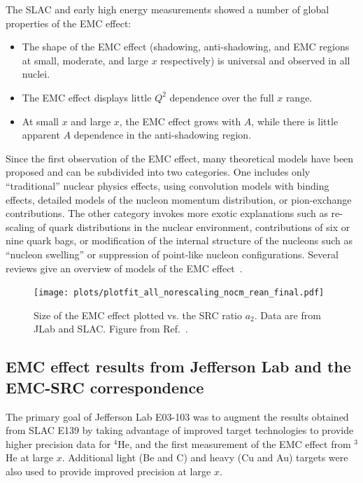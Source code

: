 The SLAC and early high energy measurements showed a number of global properties of the EMC effect:
%
\begin{itemize}
\item{The shape of the EMC effect (shadowing, anti-shadowing, and EMC regions at small, moderate, and large $x$ respectively) is universal and observed in all nuclei.}
\item{The EMC effect displays little $Q^2$ dependence over the full $x$ range.}
\item{At small $x$ and large $x$, the EMC effect grows with $A$, while there is little apparent $A$ dependence in the anti-shadowing region.}
\end{itemize}
%
Since the first observation of the EMC effect, many theoretical models have been proposed and can be subdivided into two categories.  One includes only ``traditional'' nuclear physics effects, using convolution models with binding effects, detailed models of the nucleon momentum distribution, or pion-exchange contributions. The other category invokes more exotic explanations such as re-scaling of quark distributions in the nuclear environment, contributions of six or nine
quark bags, or modification of the internal structure of the nucleons such as ``nucleon swelling'' or suppression of point-like nucleon configurations. Several reviews give an overview of models of the EMC effect~\cite{Geesaman:1995yd, Norton:2003cb, Piller:1999wx, Hen:2013oha, Malace:2014uea}.


\begin{figure}[tbp]
\centering\texttt{[image: plots/plotfit\_all\_norescaling\_nocm\_rean\_final.pdf]}
\caption{Size of the EMC effect plotted vs. the SRC ratio $a_2$. Data are from JLab and SLAC. Figure
from Ref.~\cite{Arrington:2012ax}.}
\label{fig:emc_src_bff}
\end{figure}

\subsection{EMC effect results from Jefferson Lab and the EMC-SRC correspondence}

The primary goal of Jefferson Lab E03-103 was to augment the results obtained from SLAC E139 by taking
advantage of improved target technologies to provide higher precision data for $^4$He, and the first
measurement of the EMC effect from $^3$He at large $x$.  Additional light (Be and C) and heavy (Cu and Au)
targets were also used to provide improved precision at large $x$.

